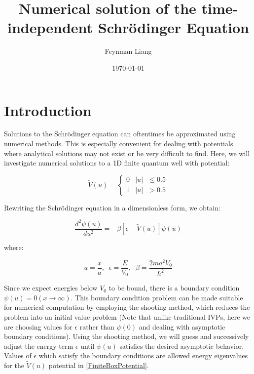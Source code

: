 \documentclass{article}
\title{Numerical solution of the time-independent Schr\"{o}dinger Equation}
\author{Feynman Liang}
\date{\today}
\begin{document}
\maketitle

\section{Introduction}
Solutions to the Schr\"{o}dinger equation can oftentimes be approximated using numerical
methods. This is especially convenient for dealing with potentials where analytical 
solutions may not exist or be very difficult to find. Here, we will investigate numerical 
solutions to a 1D finite quantum well with potential:

\begin{equation}\label{FiniteBoxPotential}
    \widetilde{V}(u)=
    \begin{cases} 0 & \text{\(\lvert u\rvert\) $\le 0.5$}
    \\
    1 & \text{\(\lvert u\rvert\) $> 0.5$}
\end{cases}
\end{equation}

Rewriting the Schr\"{o}dinger equation in a dimensionless form, we obtain:

\begin{equation}\label{FiniteBoxSchrodinger}
    \frac{d^{2}\psi(u)}{du^{2}} = -\beta\left[\epsilon-\widetilde{V}(u)\right]\psi(u)
\end{equation}

where:

\begin{equation*}\label{DimensionlessSubstitutions}
    u = \frac{x}{a},\;\;
    \epsilon = \frac{E}{V_{0}},\;\;
    \beta = \frac{2ma^{2}V_0}{\hbar^2}
\end{equation*}

Since we expect energies below $V_0$ to be bound, there is a boundary condition
$\psi(u) = 0 (x \rightarrow \infty)$. This boundary condition problem can be
made suitable for numerical computation by employing the shooting method, which
reduces the problem into an initial value problem (Note that unlike traditional
IVPs, here we are choosing values for $\epsilon$ rather than $\psi(0)$ and
dealing with asymptotic boundary conditions). Using the shooting method, we
will guess and successively adjust the energy term $\epsilon$ until $\psi(u)$
satisfies the desired asymptotic behavior. Values of $\epsilon$ which satisfy
the boundary conditions are allowed energy eigenvalues for the
$\widetilde{V}(u)$ potential
in \eqref{FiniteBoxPotential}.
\end{document}
